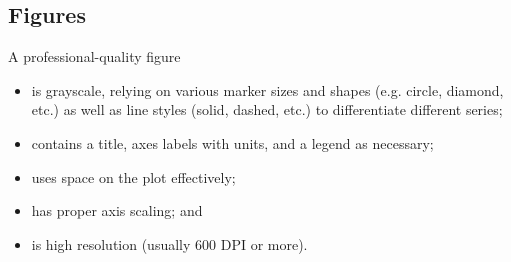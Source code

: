 \subsection{Figures}
A professional-quality figure
\begin{itemize}
    \item is grayscale, relying on various marker sizes and shapes (e.g. circle, diamond, etc.) as well as line styles (solid, dashed, etc.) to differentiate different series;
    \item contains a title, axes labels with units, and a legend as necessary;
    \item uses space on the plot effectively;
    \item has proper axis scaling; and
    \item is high resolution (usually 600 DPI or more).
\end{itemize}